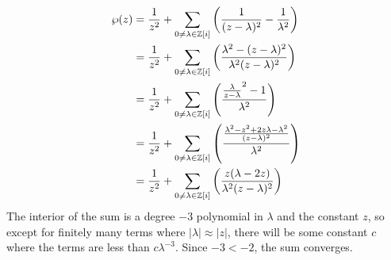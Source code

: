 \documentclass{homework}
\begin{document}
                                                                                                                    \begin{solution}
                                                                                                                    \begin{align*}
                                                                                                                    \wp(z) &= \frac{1}{z^2} + \sum_{0 \neq \lambda \in \mathbb{Z}[i]} \left( \frac{1}{(z - \lambda)^2} - \frac{1}{\lambda^2} \right)\\
                                                                                                                    &= \frac{1}{z^2} + \sum_{0 \neq \lambda \in \mathbb{Z}[i]} \left( \frac{\lambda^2 - (z-\lambda)^2}{\lambda^2(z-\lambda)^2} \right)\\
                                                                                                                    &= \frac{1}{z^2} + \sum_{0 \neq \lambda \in \mathbb{Z}[i]} \left( \frac{\frac{\lambda}{z-\lambda}^2 - 1}{\lambda^2} \right)\\
                                                                                                                    &= \frac{1}{z^2} + \sum_{0 \neq \lambda \in \mathbb{Z}[i]} \left( \frac{\frac{\lambda^2 - z^2 + 2z\lambda - \lambda^2}{(z-\lambda)^2}}{\lambda^2} \right)\\
                                                                                                                    &= \frac{1}{z^2} + \sum_{0 \neq \lambda \in \mathbb{Z}[i]} \left( \frac{z(\lambda - 2z)}{\lambda^2(z-\lambda)^2} \right)\\
                                                                                                                    \end{align*}
                                                                                                                    The interior of the sum is a degree $-3$ polynomial in $\lambda$ and the constant $z$, so except for finitely many terms where $|\lambda|\approx |z|$, there will be some constant $c$ where the terms are less than $c\lambda^{-3}$. Since $-3 < -2$, the sum converges.
                                                                                                                    \end{solution}
\end{document}
